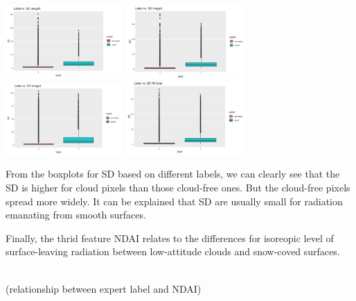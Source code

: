 \documentclass[11pt]{article}
\begin{document}
\includegraphics[width = 4.5cm]{1(c)image8.png}
\includegraphics[width = 4.5cm]{1(c)image9.png}
\includegraphics[width = 4.5cm]{1(c)image10.png}
\includegraphics[width = 4.5cm]{1(c)image11.png}

From the boxplots for SD based on different labels, we can clearly see that the SD is higher for cloud pixels than those cloud-free ones. But the cloud-free pixels spread more widely. It can be explained that SD are usually small for radiation emanating from smooth surfaces.

Finally, the thrid feature NDAI relates to the differences for isoreopic level of surface-leaving radiation between low-attitude clouds and snow-coved surfaces.

\mbox{}\\
(relationship between expert label and NDAI)
\end{document}

